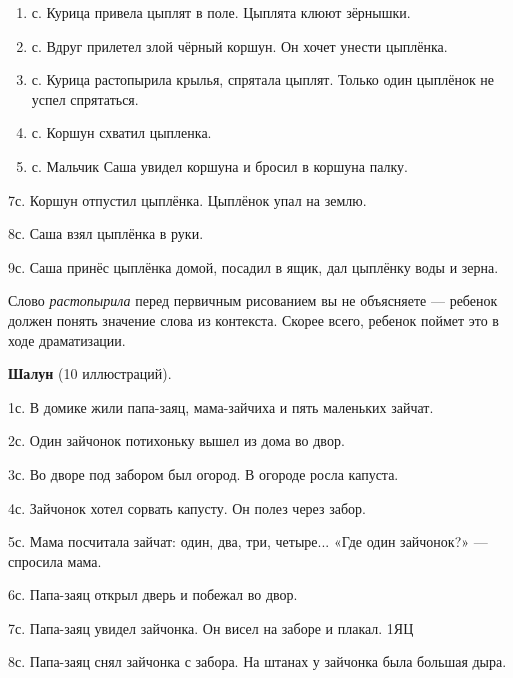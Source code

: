 \documentclass[a5paper]{book}
\renewcommand{\emph}[1]{\textit{#1}}
\begin{document}
\begin{enumerate}
\def\labelenumi{\arabic{enumi}.}
\setcounter{enumi}{1}
\item
  
  с. Курица привела цыплят в поле. Цыплята клюют зёрнышки.
  
\item
  
  с. Вдруг прилетел злой чёрный коршун. Он хочет унести цыплёнка.
  
\item
  
  с. Курица растопырила крылья, спрятала цыплят. Только один цыплёнок не
  успел спрятаться.
  
\item
  
  с. Коршун схватил цыпленка.
  
\item
  
  с. Мальчик Саша увидел коршуна и бросил в коршуна палку.
  
\end{enumerate}


7с. Коршун отпустил цыплёнка. Цыплёнок упал на землю.

8с. Саша взял цыплёнка в руки.

9с. Саша принёс цыплёнка домой, посадил в ящик, дал цыплёнку воды и
зерна.

Слово \emph{растопырила} перед первичным рисованием вы не объясняете ---
ребенок должен понять значение слова из контекста. Скорее всего, ребенок
поймет это в ходе драматизации.

\textbf{Шалун} (10 иллюстраций).

1с. В домике жили папа-заяц, мама-зайчиха и пять маленьких зайчат.

2с. Один зайчонок потихоньку вышел из дома во двор.

3с. Во дворе под забором был огород. В огороде росла капуста.

4с. Зайчонок хотел сорвать капусту. Он полез через забор.

5с. Мама посчитала зайчат: один, два, три, четыре... «Где один
зайчонок?» --- спросила мама.

6с. Папа-заяц открыл дверь и побежал во двор.

7с. Папа-заяц увидел зайчонка. Он висел на заборе и плакал. 1ЯЦ

8с. Папа-заяц снял зайчонка с забора. На штанах у зайчонка была большая
дыра.
\end{document}
